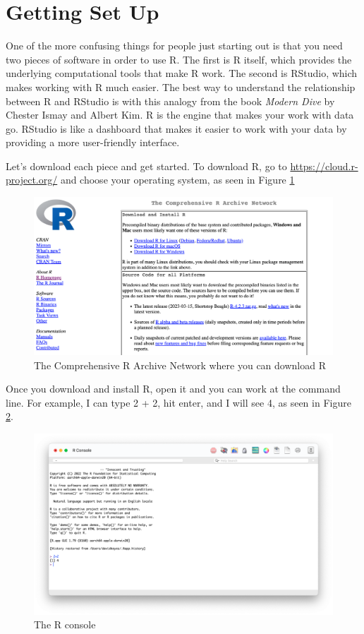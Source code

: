 \documentclass[
]{book}
\begin{document}
\hypertarget{getting-set-up}{%
\section*{Getting Set Up}\label{getting-set-up}}

One of the more confusing things for people just starting out is that you need two pieces of software in order to use R. The first is R itself, which provides the underlying computational tools that make R work. The second is RStudio, which makes working with R much easier. The best way to understand the relationship between R and RStudio is with this analogy from the book \emph{Modern Dive} by Chester Ismay and Albert Kim. R is the engine that makes your work with data go. RStudio is like a dashboard that makes it easier to work with your data by providing a more user-friendly interface.

Let's download each piece and get started. To download R, go to \url{https://cloud.r-project.org/} and choose your operating system, as seen in Figure \ref{fig:cran-download-r}

\begin{figure}
\includegraphics[width=1\linewidth]{assets/download-r} \caption{The Comprehensive R Archive Network where you can download R}\label{fig:cran-download-r}
\end{figure}

Once you download and install R, open it and you can work at the command line. For example, I can type 2 + 2, hit enter, and I will see 4, as seen in Figure \ref{fig:r-console}.

\begin{figure}
\includegraphics[width=1\linewidth]{assets/r-console} \caption{The R console}\label{fig:r-console}
\end{figure}
\end{document}
